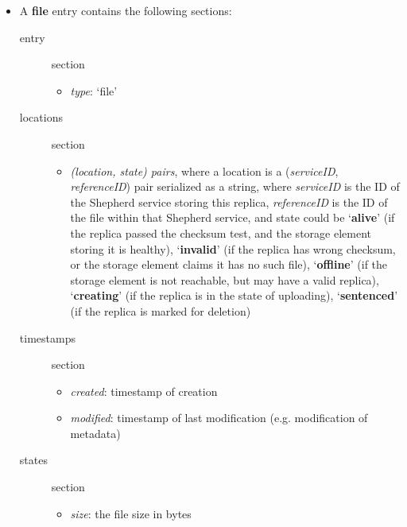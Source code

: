 \documentclass{book}
\begin{document}
\begin{itemize}
    \item A \textbf{file} entry contains the following sections: 
    \begin{description}
        \item [entry] section 
        \begin{itemize}
            \item \emph{type}: `file' 
        \end{itemize}
        \item [locations] section 
        \begin{itemize}
            \item \emph{(location, state) pairs}, where a location is a (\emph{serviceID}, \emph{referenceID}) pair serialized as a  string, where \emph{serviceID} is the ID of the Shepherd service storing this replica, \emph{referenceID} is the ID of the file within that Shepherd service, and state could be `\textbf{alive}' (if the replica passed the checksum test, and the storage element storing it is healthy), `\textbf{invalid}' (if the replica has wrong checksum, or the storage element claims it has no such file), `\textbf{offline}' (if the storage element is not reachable, but may have a valid replica), `\textbf{creating}' (if the replica is in the state of uploading), `\textbf{sentenced}' (if the replica is marked for deletion) 
        \end{itemize}
        \item [timestamps] section 
        \begin{itemize}
            \item \emph{created}: timestamp of creation 
            \item \emph{modified}: timestamp of last modification (e.g. modification of metadata)
        \end{itemize}
        \item [states] section 
        \begin{itemize}
            \item \emph{size}: the file size in bytes

\end{itemize}
\end{description}
\end{itemize}
\end{document}
